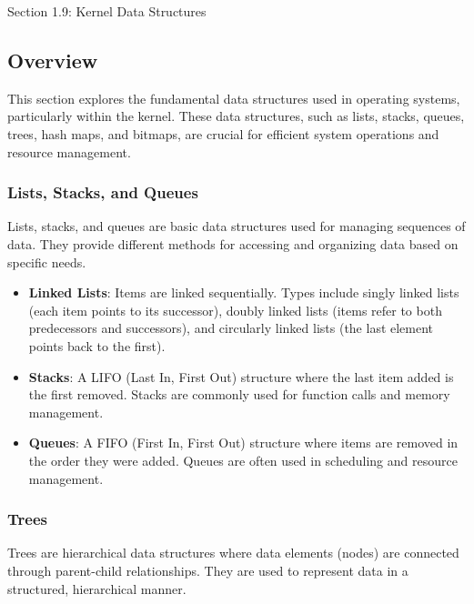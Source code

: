 \begin{notes}{Section 1.9: Kernel Data Structures}
    \subsection*{Overview}

    This section explores the fundamental data structures used in operating systems, particularly within the kernel. These data structures, such as lists, stacks, queues, trees, hash maps, and bitmaps, 
    are crucial for efficient system operations and resource management.
    
    \subsubsection*{Lists, Stacks, and Queues}
    
    Lists, stacks, and queues are basic data structures used for managing sequences of data. They provide different methods for accessing and organizing data based on specific needs.
    
    \begin{highlight}
    
    \begin{itemize}
        \item \textbf{Linked Lists}: Items are linked sequentially. Types include singly linked lists (each item points to its successor), doubly linked lists (items refer to both predecessors and successors), 
        and circularly linked lists (the last element points back to the first).
        \item \textbf{Stacks}: A LIFO (Last In, First Out) structure where the last item added is the first removed. Stacks are commonly used for function calls and memory management.
        \item \textbf{Queues}: A FIFO (First In, First Out) structure where items are removed in the order they were added. Queues are often used in scheduling and resource management.
    \end{itemize}
    
    \end{highlight}
    
    \subsubsection*{Trees}
    
    Trees are hierarchical data structures where data elements (nodes) are connected through parent-child relationships. They are used to represent data in a structured, hierarchical manner.
    

\end{notes}
